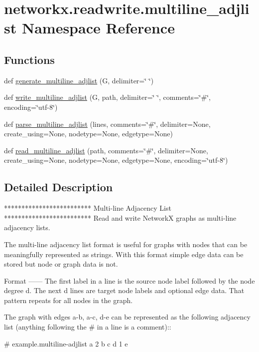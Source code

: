 \hypertarget{namespacenetworkx_1_1readwrite_1_1multiline__adjlist}{}\section{networkx.\+readwrite.\+multiline\+\_\+adjlist Namespace Reference}
\label{namespacenetworkx_1_1readwrite_1_1multiline__adjlist}
\subsection*{Functions}
\begin{DoxyCompactItemize}
\item 
def \hyperlink{namespacenetworkx_1_1readwrite_1_1multiline__adjlist_a83fcdce846ddc885e89c46af2f4a645c}{generate\+\_\+multiline\+\_\+adjlist} (G, delimiter=\char`\"{} \char`\"{})
\item 
def \hyperlink{namespacenetworkx_1_1readwrite_1_1multiline__adjlist_a80c0b8a5397ceadc6d8c493ac9007688}{write\+\_\+multiline\+\_\+adjlist} (G, path, delimiter=\char`\"{} \char`\"{}, comments=\char`\"{}\#\char`\"{}, encoding=\char`\"{}utf-\/8\char`\"{})
\item 
def \hyperlink{namespacenetworkx_1_1readwrite_1_1multiline__adjlist_a6e7ce7a95b86a569d5851d976a6e7f12}{parse\+\_\+multiline\+\_\+adjlist} (lines, comments=\char`\"{}\#\char`\"{}, delimiter=None, create\+\_\+using=None, nodetype=None, edgetype=None)
\item 
def \hyperlink{namespacenetworkx_1_1readwrite_1_1multiline__adjlist_abf57e1a57f1d37fbbfea32c1da23cb7d}{read\+\_\+multiline\+\_\+adjlist} (path, comments=\char`\"{}\#\char`\"{}, delimiter=None, create\+\_\+using=None, nodetype=None, edgetype=None, encoding=\char`\"{}utf-\/8\char`\"{})
\end{DoxyCompactItemize}


\subsection{Detailed Description}
\begin{DoxyVerb}*************************
Multi-line Adjacency List
*************************
Read and write NetworkX graphs as multi-line adjacency lists.

The multi-line adjacency list format is useful for graphs with
nodes that can be meaningfully represented as strings.  With this format
simple edge data can be stored but node or graph data is not.

Format
------
The first label in a line is the source node label followed by the node degree
d.  The next d lines are target node labels and optional edge data.
That pattern repeats for all nodes in the graph.

The graph with edges a-b, a-c, d-e can be represented as the following
adjacency list (anything following the # in a line is a comment)::

     # example.multiline-adjlist
     a 2
     b
     c
     d 1
     e
\end{DoxyVerb}
 

